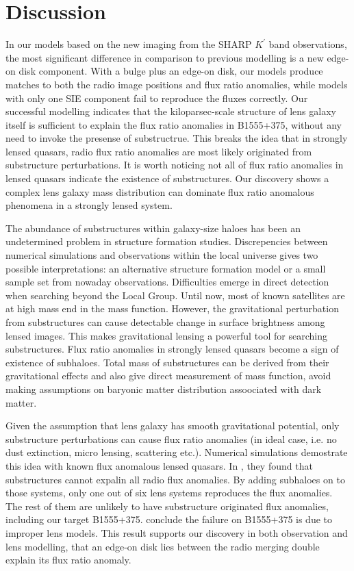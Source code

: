 \documentclass[useAMS,usenatbib]{mn2e}
\begin{document}
\section{Discussion}

In our models based on the new imaging from the SHARP $K^{\prime}$
band observations, the most significant difference in comparison to
previous modelling is a new edge-on disk component. With a bulge plus
an edge-on disk, our models produce matches to both the radio image
positions and flux ratio anomalies, while models with only one SIE
component \citep{Marlow,Xu14} fail to reproduce the fluxes
correctly. Our successful modelling indicates that the
kiloparsec-scale structure of lens galaxy itself is sufficient to
explain the flux ratio anomalies in B1555+375, without any need to
invoke the presense of substructrue. This breaks the idea that in
strongly lensed quasars, radio flux ratio anomalies are most likely
originated from substructure perturbations. It is worth noticing not
all of flux ratio anomalies in lensed quasars indicate the existence
of substructures. Our discovery shows a complex lens galaxy mass
distribution can dominate flux ratio anomalous phenomena in a strongly
lensed system.

The abundance of substructures within galaxy-size haloes has been an undetermined problem in structure formation studies. Discrepencies between numerical simulations and observations within the local universe gives two possible interpretations: an alternative structure formation model or a small sample set from nowaday observations. Difficulties emerge in direct detection when searching beyond the Local Group. Until now, most of known satellites are at high mass end in the mass function. However, the gravitational perturbation from substructures can cause detectable change in surface brightness among lensed images. This makes gravitational lensing a powerful tool for searching substructures. Flux ratio anomalies in strongly lensed quasars become a sign of existence of subhaloes. Total mass of substructures can be derived from their gravitational effects and also give direct measurement of mass function, avoid making assumptions on baryonic matter distribution assoociated with dark matter.

Given the assumption that lens galaxy has smooth gravitational potential, only substructure perturbations can cause flux ratio anomalies (in ideal case, i.e. no dust extinction, micro lensing, scattering etc.). Numerical simulations demostrate this idea with known flux anomalous lensed quasars. In \citet{Xu14}, they found that substructures cannot expalin all radio flux anomalies. By adding subhaloes on to those systems, only one out of six lens systems reproduces the flux anomalies. The rest of them are unlikely to have substructure originated flux anomalies, including our target B1555+375. \citet{Xu14} conclude the failure on B1555+375 is due to improper lens models. This result supports our discovery in both observation and lens modelling, that an edge-on disk lies  between the radio merging double explain its flux ratio anomaly. 
\end{document}
